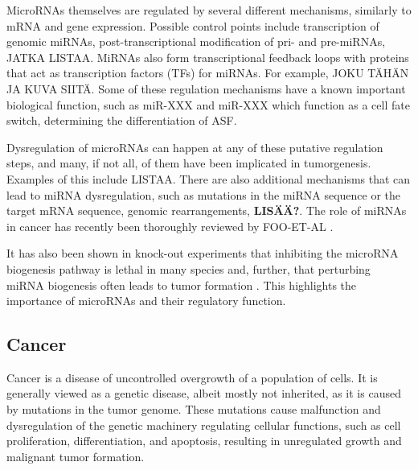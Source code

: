 MicroRNAs themselves are regulated by several different mechanisms, similarly
to mRNA and gene expression. Possible control points include transcription of
genomic miRNAs, post-transcriptional modification of pri- and pre-miRNAs,
JATKA LISTAA. MiRNAs also form transcriptional feedback loops with proteins
that act as transcription factors (TFs) for miRNAs. For example, JOKU TÄHÄN JA
KUVA SIITÄ. Some of these regulation mechanisms have a known important
biological function, such as miR-XXX and miR-XXX which function as a cell fate
switch, determining the differentiation of ASF.

Dysregulation of microRNAs can happen at any of these putative regulation
steps, and many, if not all, of them have been implicated in tumorgenesis.
Examples of this include LISTAA. There are also additional mechanisms that can
lead to miRNA dysregulation, such as mutations in the miRNA sequence or the
target mRNA sequence, genomic rearrangements,
\textbf{LISÄÄ?}. The role of miRNAs in cancer has recently been
thoroughly reviewed by FOO-ET-AL \citep{CITE}.

It has also been shown in knock-out experiments that inhibiting the microRNA
biogenesis pathway is lethal in many species \citep{CITE} and, further, that
perturbing miRNA biogenesis often leads to tumor formation \citep{CITE}. This
highlights the importance of microRNAs and their regulatory function.












\subsection{Cancer}\label{cancer}

Cancer is a disease of uncontrolled overgrowth of a population of cells. It is
generally viewed as a genetic disease, albeit mostly not inherited, as it is
caused by  mutations in the tumor genome. These mutations cause malfunction
and dysregulation of the genetic machinery regulating cellular functions, such
as cell proliferation, differentiation, and apoptosis, resulting in
unregulated growth and malignant tumor formation.

